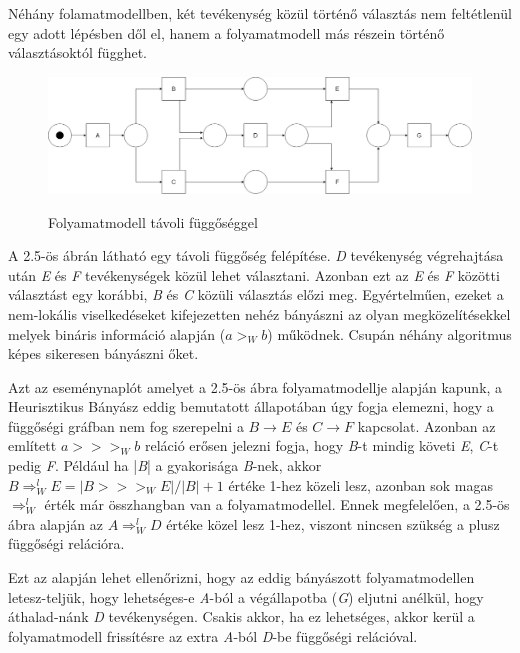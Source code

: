 Néhány folamatmodellben, két tevékenység közül történő választás nem feltétlenül egy adott lépésben dől el, hanem a folyamatmodell más részein történő választásoktól függhet.

\begin{figure}[h!]
\begin{center}
\includegraphics[width=\textwidth,keepaspectratio=true]{images/img_heuristic_longdistance}
\label{fig:plan}
\end{center}
\caption{Folyamatmodell távoli függőséggel}
\end{figure}

A 2.5-ös ábrán látható egy távoli függőség felépítése. \textit{D} tevékenység végrehajtása után \textit{E} és \textit{F} tevékenységek közül lehet választani. Azonban ezt az \textit{E} és \textit{F} közötti választást egy korábbi, \textit{B} és \textit{C} közüli választás előzi meg. Egyértelműen, ezeket a nem-lokális viselkedéseket kifejezetten nehéz bányászni az olyan megközelítésekkel melyek bináris információ alapján ($a>_Wb$) működnek. Csupán néhány algoritmus képes sikeresen bányászni őket.

Azt az eseménynaplót amelyet a 2.5-ös ábra folyamatmodellje alapján kapunk, a Heurisztikus Bányász eddig bemutatott állapotában úgy fogja elemezni, hogy a függőségi gráfban nem fog szerepelni a $B\rightarrow E$ és $C\rightarrow F$ kapcsolat. Azonban az említett $a>>>_Wb$ reláció erősen jelezni fogja, hogy \textit{B}-t mindig követi \textit{E}, \textit{C}-t pedig \textit{F}. Például ha |\textit{B}| a gyakorisága \textit{B}-nek, akkor $B\Rightarrow_W^l E = |B >>>_WE|/|B|+1$ értéke 1-hez közeli lesz, azonban sok magas $\Rightarrow_W^l $ érték már összhangban van a folyamatmodellel. Ennek megfelelően, a 2.5-ös ábra alapján az $A\Rightarrow_W^lD$ értéke közel lesz 1-hez, viszont nincsen szükség a plusz függőségi relációra.

Ezt az alapján lehet ellenőrizni, hogy az eddig bányászott folyamatmodellen letesz\hyp{}teljük, hogy lehetséges-e \textit{A}-ból a végállapotba (\textit{G}) eljutni anélkül, hogy áthalad\hyp{}nánk \textit{D} tevékenységen. Csakis akkor, ha ez lehetséges, akkor kerül a folyamatmodell frissítésre az extra \textit{A}-ból \textit{D}-be függőségi relációval.
\cite{book:heuristic}

